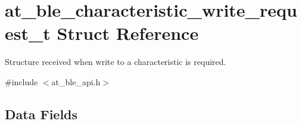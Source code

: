 \hypertarget{structat__ble__characteristic__write__request__t}{}\section{at\+\_\+ble\+\_\+characteristic\+\_\+write\+\_\+request\+\_\+t Struct Reference}
\label{structat__ble__characteristic__write__request__t}


Structure received when write to a characteristic is required.  




{\ttfamily \#include $<$at\+\_\+ble\+\_\+api.\+h$>$}

\subsection*{Data Fields}
